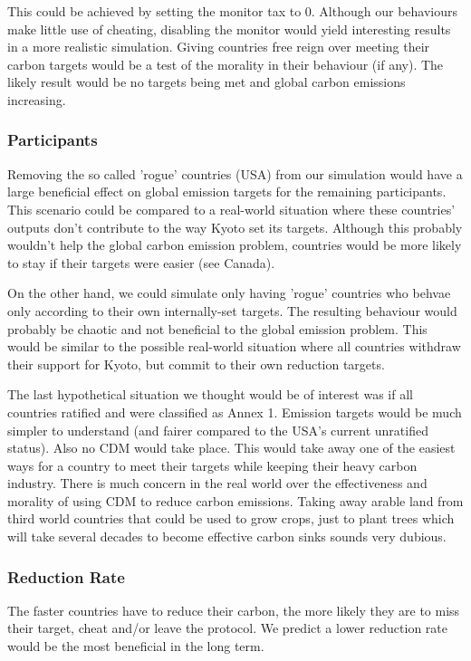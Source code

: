 This could be achieved by setting the monitor tax to 0. Although our behaviours make little use of cheating, disabling the monitor would yield interesting results in a more realistic simulation. Giving countries free reign over meeting their carbon targets would be a test of the morality in their behaviour (if any). The likely result would be no targets being met and global carbon emissions increasing.

\subsubsection{Participants}

Removing the so called 'rogue' countries (USA) from our simulation would have a large beneficial effect on global emission  targets for the remaining participants. This scenario could be compared to a real-world situation where these countries' outputs don't contribute to the way Kyoto set its targets. Although this probably wouldn't help the global carbon emission problem, countries would be more likely to stay if their targets were easier (see Canada).

On the other hand, we could simulate only having 'rogue' countries who behvae only according to their own internally-set targets. The resulting behaviour would probably be chaotic and not beneficial to the global emission problem. This would be similar to the possible real-world situation where all countries withdraw their support for Kyoto, but commit to their own reduction targets.

The last hypothetical situation we thought would be of interest was if all countries ratified and were classified as Annex 1. Emission targets would be much simpler to understand (and fairer compared to the USA's current unratified status). Also no CDM would take place. This would take away one of the easiest ways for a country to meet their targets while keeping their heavy carbon industry. There is much concern in the real world over the effectiveness and morality of using CDM to reduce carbon emissions. Taking away arable land from third world countries that could be used to grow crops, just to plant trees which will take several decades to become effective carbon sinks sounds very dubious.

\subsubsection{\CO Reduction Rate}

The faster countries have to reduce their carbon, the more likely they are to miss their target, cheat and/or leave the protocol. We predict a lower reduction rate would be the most beneficial in the long term.

